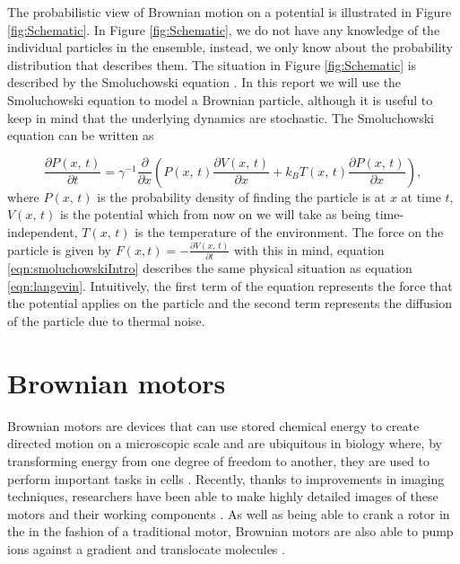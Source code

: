 The probabilistic view of Brownian motion on a potential is illustrated in Figure \ref{fig:Schematic}. In Figure \ref{fig:Schematic}, we do not have any knowledge of the individual particles in the ensemble, instead, we only know about the probability distribution that describes them. The situation in Figure \ref{fig:Schematic} is described by the Smoluchowski equation \cite{Gardiner2009}. In this report we will use the Smoluchowski equation to model a Brownian particle, although it is useful to keep in mind that the underlying dynamics are stochastic. The Smoluchowski equation can be written as

\begin{equation}
\frac{\partial P(x, \, t)}{\partial t} =  \gamma^{-1} \frac{\partial}{\partial x} \left (P(x, \, t) \frac{\partial V(x, \, t)}{\partial x} + k_B T(x,  \, t) \frac{\partial P(x, \, t)}{\partial x} \right ), \label{eqn:smoluchowskiIntro}
\end{equation}
where $P(x, \, t)$ is the probability density of finding the particle is at $x$ at time $t$, $V(x, \, t )$ is the potential which from now on we will take as being time-independent, $T(x, \, t)$ is the temperature of the environment. The force on the particle is given by $F(x, t) = -\frac{\partial V(x, \, t)}{\partial t}$ with this in mind, equation \ref{eqn:smoluchowskiIntro} describes the same physical situation as equation \ref{eqn:langevin}. Intuitively, the first term of the equation represents the force that the potential applies on the particle and the second term represents the diffusion of the particle due to thermal noise.

\section{Brownian motors}
Brownian motors are devices that can use stored chemical energy to create directed motion on a microscopic scale and are ubiquitous in biology where, by transforming energy from one degree of freedom to another, they are used to perform important tasks in cells \cite{PhillipsQuakeMay2006, Magnasco1994,Nelson2014}. Recently, thanks to improvements in imaging techniques, researchers have been able to make highly detailed images of these motors and their working components \cite{YiWeiChang2016}. As well as being able to crank a rotor in the in the fashion of a traditional motor, Brownian motors are also able to pump ions against a gradient and translocate molecules \cite{Magnasco1994, Reimann2001, Leibler1993, leibler1990physical}.

